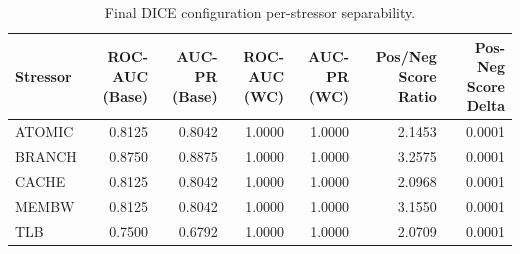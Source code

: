 \begin{table}[t]
\centering
\caption{Final DICE configuration per-stressor separability.}
\label{tab:dice_full_stressor}
\footnotesize
\begin{tabular}{lrrrrrr}
\toprule
Stressor & ROC-AUC (Base) & AUC-PR (Base) & ROC-AUC (WC) & AUC-PR (WC) & Pos/Neg Score Ratio & Pos-Neg Score Delta \\
\midrule
ATOMIC & 0.8125 & 0.8042 & 1.0000 & 1.0000 & 2.1453 & 0.0001 \\
BRANCH & 0.8750 & 0.8875 & 1.0000 & 1.0000 & 3.2575 & 0.0001 \\
CACHE & 0.8125 & 0.8042 & 1.0000 & 1.0000 & 2.0968 & 0.0001 \\
MEMBW & 0.8125 & 0.8042 & 1.0000 & 1.0000 & 3.1550 & 0.0001 \\
TLB & 0.7500 & 0.6792 & 1.0000 & 1.0000 & 2.0709 & 0.0001 \\
\bottomrule
\end{tabular}

\end{table}
